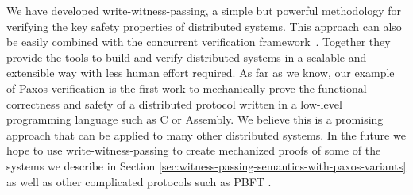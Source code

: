 
We have developed write-witness-passing, a simple but powerful methodology for
verifying the key safety properties of distributed systems.
This approach can also be easily combined with
the concurrent verification framework~\cite{concurrency}.
Together they provide the tools
to build and verify distributed systems in a scalable and extensible way with 
less human effort required.
As far as we know, our example of Paxos verification
is the first work to mechanically prove the functional correctness
and safety of a distributed protocol written in
a low-level programming language such as C or Assembly.
We believe this is a promising approach that can be applied to many other distributed systems.
In the future we hope to use write-witness-passing to create mechanized proofs of some of the systems we
describe in Section \ref{sec:witness-passing-semantics-with-paxos-variants} as well as other
complicated protocols such as PBFT \cite{pbft}.
